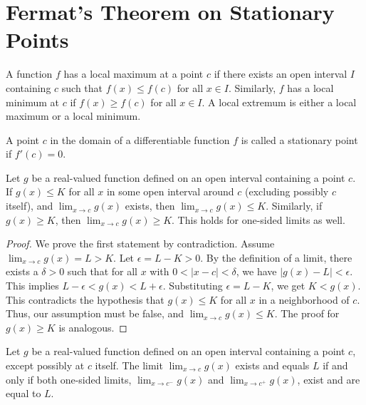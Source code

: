 \chapter{Fermat's Theorem on Stationary Points}

\begin{definition}
    \label{def:Local_Extremum}
    A function $f$ has a local maximum at a point $c$ if there exists an open interval $I$ containing $c$ such that $f(x) \leq f(c)$ for all $x \in I$. Similarly, $f$ has a local minimum at $c$ if $f(x) \geq f(c)$ for all $x \in I$. A local extremum is either a local maximum or a local minimum.
\end{definition}

\begin{definition}
    \label{def:Stationary_Point}
    A point $c$ in the domain of a differentiable function $f$ is called a stationary point if $f'(c) = 0$.
\end{definition}

\begin{lemma}
    \label{lem:Preservation_of_Inequality_under_Limits}
    Let $g$ be a real-valued function defined on an open interval containing a point $c$.
    If $g(x) \leq K$ for all $x$ in some open interval around $c$ (excluding possibly $c$ itself), and $\lim_{x \to c} g(x)$ exists, then $\lim_{x \to c} g(x) \leq K$.
    Similarly, if $g(x) \geq K$, then $\lim_{x \to c} g(x) \geq K$. This holds for one-sided limits as well.
\end{lemma}

\begin{proof}
    We prove the first statement by contradiction. Assume $\lim_{x \to c} g(x) = L > K$. Let $\epsilon = L - K > 0$. By the definition of a limit, there exists a $\delta > 0$ such that for all $x$ with $0 < |x-c| < \delta$, we have $|g(x) - L| < \epsilon$. This implies $L - \epsilon < g(x) < L + \epsilon$. Substituting $\epsilon = L - K$, we get $K < g(x)$. This contradicts the hypothesis that $g(x) \leq K$ for all $x$ in a neighborhood of $c$. Thus, our assumption must be false, and $\lim_{x \to c} g(x) \leq K$. The proof for $g(x) \geq K$ is analogous.
\end{proof}

\begin{lemma}
    \label{lem:Two_Sided_Limit_Existence}
    Let $g$ be a real-valued function defined on an open interval containing a point $c$, except possibly at $c$ itself. The limit $\lim_{x \to c} g(x)$ exists and equals $L$ if and only if both one-sided limits, $\lim_{x \to c^-} g(x)$ and $\lim_{x \to c^+} g(x)$, exist and are equal to $L$.
\end{lemma}


